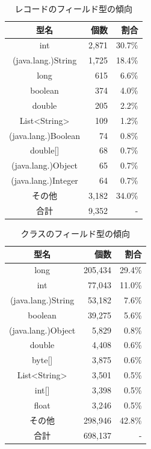 \begin{table}[t]
    \caption{レコードのフィールド型の傾向}
    \label{record_field_types}
    \centering
    \begin{tabular}{c||r|r}
        \hline
        型名 & 個数 & 割合\\
        \hline\hline
        int & 2,871 & 30.7\%\\
        (java.lang.)String & 1,725 & 18.4\%\\
        long & 615 & 6.6\%\\
        boolean & 374 & 4.0\%\\
        double & 205 & 2.2\%\\
        List<String> & 109 & 1.2\%\\
        (java.lang.)Boolean & 74 & 0.8\%\\
        double[] & 68 & 0.7\%\\
        (java.lang.)Object & 65 & 0.7\%\\
        (java.lang.)Integer & 64 & 0.7\%\\
        その他 & 3,182 & 34.0\%\\
        \hline
        合計 & 9,352 & -\\
        \hline
    \end{tabular}
\end{table}

\begin{table}[t]
    \caption{クラスのフィールド型の傾向}
    \label{class_field_types}
    \centering
    \begin{tabular}{c||r|r}
        \hline
        型名 & 個数 & 割合\\
        \hline\hline
        long & 205,434 & 29.4\%\\
        int & 77,043 & 11.0\%\\
        (java.lang.)String & 53,182 & 7.6\%\\
        boolean & 39,275 & 5.6\%\\
        (java.lang.)Object & 5,829 & 0.8\%\\
        double & 4,408 & 0.6\%\\
        byte[] & 3,875 & 0.6\%\\
        List<String> & 3,501 & 0.5\%\\
        int[] & 3,398 & 0.5\%\\
        float & 3,246 & 0.5\%\\
        その他 & 298,946 & 42.8\%\\
        \hline
        合計 & 698,137 & - \\
        \hline
    \end{tabular}
\end{table}

